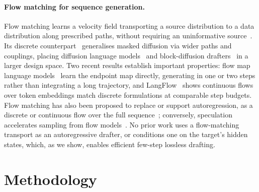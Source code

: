 \documentclass{article}
\begin{document}
\paragraph{Flow matching for sequence generation.}Flow matching learns a velocity field transporting a source distribution to a data distribution along prescribed paths, without requiring an uninformative source~\citep{lipman2023flowmatching}. Its discrete counterpart~\citep{gat2024dfm,campbell2024discreteflows} generalises masked diffusion via wider paths and couplings, placing diffusion language models~\citep{nie2025llada} and block-diffusion drafters~\citep{arriola2025blockdiffusion} in a larger design space. Two recent results establish important properties: flow map language models~\citep{lee2026flowmap} learn the endpoint map directly, generating in one or two steps rather than integrating a long trajectory, and LangFlow~\citep{chen2026langflow} shows continuous flows over token embeddings match discrete formulations at comparable step budgets. Flow matching has also been proposed to replace or support autoregression, as a discrete or continuous flow over the full sequence~\citep{wang2025fudoki,shao2025calm}; conversely, speculation accelerates sampling from flow models~\citep{flowcast2026}. No prior work uses a flow-matching transport as an autoregressive drafter, or conditions one on the target's hidden states, which, as we show, enables efficient few-step lossless drafting.

%

\section{Methodology}
\label{sec:method}
\end{document}
